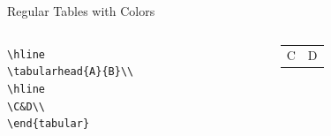 \documentclass[english,sectioncirclenumberstyle]{ciadbeamer}
\begin{document}
\begin{frame}[t]{{Regular Tables} with Colors}
\begin{columns}
\begin{column}{.6\linewidth}
				\texttt{{\textbackslash}hline} \\
				\texttt{{\textbackslash}tabularhead\{A\}\{B\}{\textbackslash}{\textbackslash}} \\
				\texttt{{\textbackslash}hline} \\
				\texttt{{\textbackslash}C\&D{\textbackslash}{\textbackslash}} \\
				\texttt{{\textbackslash}end\{tabular\}}
			\end{column}
			\begin{column}{.3\linewidth}
				\begin{tabular}{|l|l|}
					\hline
					\tabularhead{A}{B} \\
					\hline
					C & D \\
					\hline
				\end{tabular}	
			\end{column}
		\end{columns}
\end{frame}
\end{document}
